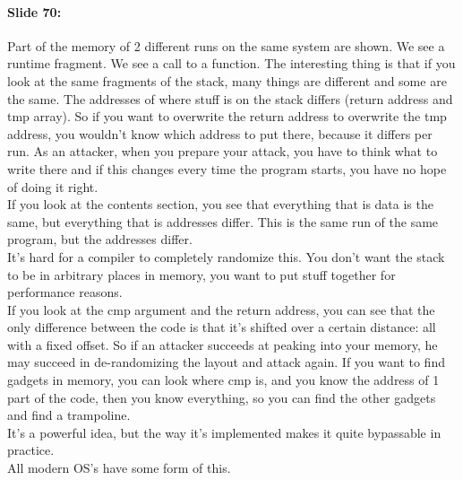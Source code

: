 \documentclass[10pt,a4paper]{report}
\begin{document}
\paragraph{Slide 70:} Part of the memory of 2 different runs on the same system are shown. We see a runtime fragment. We see a call to a function. The interesting thing is that if you look at the same fragments of the stack, many things are different and some are the same. The addresses of where stuff is on the stack differs (return address and tmp array). So if you want to overwrite the return address to overwrite the tmp address, you wouldn't know which address to put there, because it differs per run. As an attacker, when you prepare your attack, you have to think what to write there and if this changes every time the program starts, you have no hope of doing it right.\\
If you look at the contents section, you see that everything that is data is the same, but everything that is addresses differ. This is the same run of the same program, but the addresses differ.\\
It's hard for a compiler to completely randomize this. You don’t want the stack to be in arbitrary places in memory, you want to put stuff together for performance reasons.\\
If you look at the cmp argument and the return address, you can see that the only difference between the code is that it's shifted over a certain distance: all with a fixed offset. So if an attacker succeeds at peaking into your memory, he may succeed in de-randomizing the layout and attack again. If you want to find gadgets in memory, you can look where cmp is, and you know the address of 1 part of the code, then you know everything, so you can find the other gadgets and find a trampoline.\\
It's a powerful idea, but the way it's implemented makes it quite bypassable in practice.\\
All modern OS's have some form of this.
\end{document}
